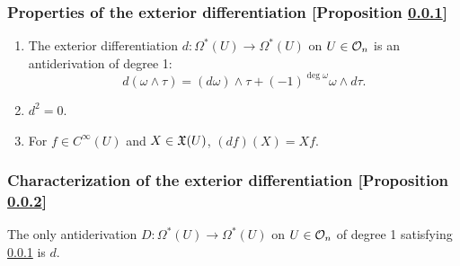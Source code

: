 \subsubsection{Properties of the exterior differentiation [Proposition \ref{properties-of-the-exterior-differentiation}]}\label{properties-of-the-exterior-differentiation}
\begin{enumerate}
\item The exterior differentiation $d \colon \Omega^*(U) \to \Omega^*(U)$ on $U \in \mathcal{O}_{n}$ is an antiderivation of degree 1:
\[
d(\omega \wedge \tau) = (d\omega)\wedge \tau + (-1)^{\deg \omega} \omega \wedge d \tau.
\]
\item $d^2 = 0$.
\item For $f \in C^\infty(U)$ and $X \in \mathfrak{X}(U)$, $(df)(X) = Xf$.
\end{enumerate}

\subsubsection{Characterization of the exterior differentiation [Proposition \ref{characterization-of-the-exterior-differentiation}]}\label{characterization-of-the-exterior-differentiation}
The only antiderivation $D\colon \Omega^*(U) \to \Omega^*(U)$ on $U \in \mathcal{O}_{n}$ of degree 1 satisfying \ref{properties-of-the-exterior-differentiation} is $d$.
